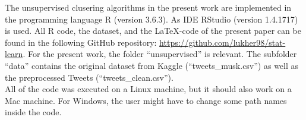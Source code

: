 The unsupervised clusering algorithms in the present work are implemented in the programming language R (version 3.6.3). As IDE RStudio (version 1.4.1717) is used. All R code, the dataset, and the \LaTeX-code of the present paper can be found in the following GitHub repository: \url{https://github.com/lukher98/stat-learn}. For the present work, the folder \enquote{unsupervised} is relevant. The subfolder \enquote{data} contains the original dataset from Kaggle (\enquote{tweets\_musk.csv}) as well as the preprocessed Tweets (\enquote{tweets\_clean.csv}).\\

All of the code was executed on a Linux machine, but it should also work on a Mac machine. For Windows, the user might have to change some path names inside the code.
